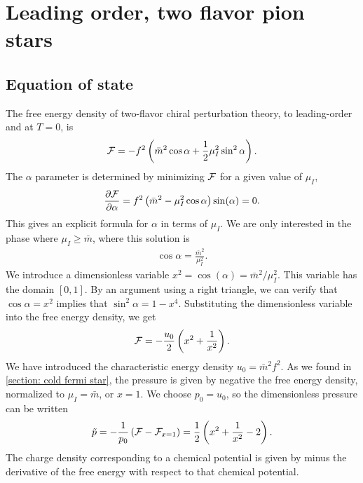 \section{Leading order, two flavor pion stars}


\subsection{Equation of state}
The free energy density of two-flavor chiral perturbation theory, to leading-order and at $T = 0$, is
%
\begin{equation}
    \mathcal{F} = - f^2 \left(\bar m^2 \cos \alpha + \frac{1}{2} \mu_I^2 \sin^2 \alpha\right).
\end{equation}
%
The $\alpha$ parameter is determined by minimizing $\mathcal{F}$ for a given value of $\mu_I$,
%
\begin{equation}
    \pdv{\mathcal{F}}{\alpha} = f^2 \left(\bar m^2 - \mu_I^2 \cos \alpha\right) \sin(\alpha) = 0.
\end{equation}
%
This gives an explicit formula for $\alpha$ in terms of $\mu_I$.
We are only interested in the phase where $\mu_I \geq \bar m$, where this solution is
%
\begin{align}
    \label{alpha as function of mu lowest order}
    \cos \alpha = \frac{\bar m^2}{\mu_I^2}.
\end{align}
%
We introduce a dimensionless variable $x^2 = \cos(\alpha) = \bar m^2 / \mu_I^2$.
This variable has the domain $[0, 1]$.
By an argument using a right triangle, we can verify that $\cos \alpha = x^2$ implies that $\sin^2 \alpha = 1 - x^4$.
Substituting the dimensionless variable into the free energy density, we get 
%
\begin{equation}
    \mathcal{F} = - \frac{u_0}{2} \left( x^2 + \frac{1}{x^2} \right).
\end{equation}
%
We have introduced the characteristic energy density $u_0 = \bar m^2 f^2$.
As we found in \autoref{section: cold fermi star}, the pressure is given by negative the free energy density, normalized to $\mu_I = \bar m$, or $x = 1$.
We choose $p_0 = u_0$, so the dimensionless pressure can be written
%
\begin{equation}
    \label{pressure leading order chpt}
    \tilde p = -\frac{1}{p_0} \left(\mathcal{F} - \mathcal{F}_{x=1}\right) 
    = \frac{1}{2} \left( x^2 + \frac{1}{x^2} - 2 \right).
\end{equation}
%
The charge density corresponding to a chemical potential is given by minus the derivative of the free energy with respect to that chemical potential. 

